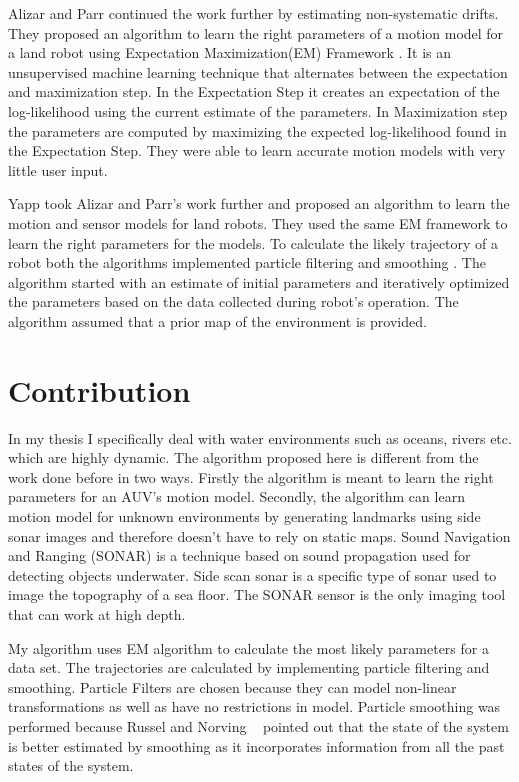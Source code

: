 \documentclass[12pt]{dalcsthesis}
\begin{document}
Alizar and Parr \cite{Eliazar2004} continued the work further by estimating non-systematic drifts.  They proposed an algorithm to learn the right parameters of a motion model for a land robot using Expectation Maximization(EM) Framework \cite{dempster1977maximum}. It is an unsupervised machine learning technique that alternates between the expectation and maximization step. In the Expectation Step it creates an expectation of the log-likelihood using the current estimate of the parameters. In Maximization step the parameters are computed by maximizing the expected log-likelihood found in the Expectation Step. They were able to learn accurate motion models with very little user input.

Yapp \cite{Yap2008} took Alizar and Parr's \cite{Eliazar2004} work further and proposed an algorithm to learn the motion and sensor models for land robots. They used the same EM framework to learn the right parameters for the models. To calculate the likely trajectory of a robot both the algorithms implemented particle filtering \cite{ristic2004beyond} \cite{chen2003bayesian} and smoothing \cite{doucet2000monte}.  The algorithm started with an estimate of initial parameters and iteratively optimized the parameters based on the data collected during robot's operation. The algorithm assumed that a prior map of the environment is provided. 

\section{Contribution}

In my thesis I specifically deal with water environments such as oceans, rivers etc. which are highly dynamic.  The algorithm proposed here is different from the work done before in two ways. Firstly the algorithm is meant to learn the right parameters for an AUV's motion model. Secondly, the algorithm can learn motion model for unknown environments by generating landmarks using side sonar images and therefore doesn't have to rely on static maps. Sound Navigation and Ranging (SONAR) is a technique based on sound propagation used for detecting objects underwater. Side scan sonar is a specific type of sonar used to image the topography of a sea floor.  The SONAR sensor is the only imaging tool that can work at high depth. 

My algorithm uses EM algorithm to calculate the most likely parameters for a data set.  The trajectories are calculated by implementing particle filtering and smoothing.  Particle Filters are chosen because they can model non-linear transformations as well as have no restrictions in model. Particle smoothing was performed because Russel and Norving ~\cite{russell2003artificial} pointed out that the state of the system is better estimated by smoothing as it incorporates information from all the past states of the system. 
\end{document}

